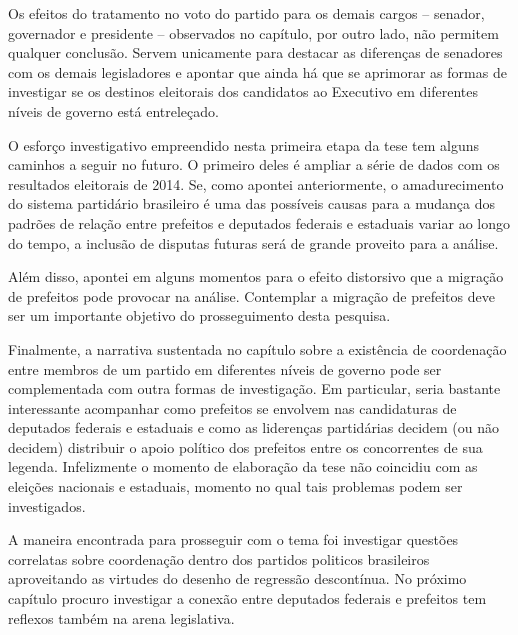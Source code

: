 Os efeitos do tratamento no voto do partido para os demais cargos -- senador, governador e presidente -- observados no capítulo, por outro lado, não permitem qualquer conclusão. Servem unicamente para destacar as diferenças de senadores com os demais legisladores e apontar que ainda há que se aprimorar as formas de investigar se os destinos eleitorais dos candidatos ao Executivo em diferentes níveis de governo está entreleçado.

O esforço investigativo empreendido nesta primeira etapa da tese tem alguns caminhos a seguir no futuro. O primeiro deles é ampliar a série de dados com os resultados eleitorais de 2014. Se, como apontei anteriormente, o amadurecimento do sistema partidário brasileiro é uma das possíveis causas para a mudança dos padrões de relação entre prefeitos e deputados federais e estaduais variar ao longo do tempo, a inclusão de disputas futuras será de grande proveito para a análise.

Além disso, apontei em alguns momentos para o efeito distorsivo que a migração de prefeitos pode provocar na análise. Contemplar a migração de prefeitos deve ser um importante objetivo do prosseguimento desta pesquisa.

Finalmente, a narrativa sustentada no capítulo sobre a existência de coordenação entre membros de um partido em diferentes níveis de governo pode ser complementada com outra formas de investigação. Em particular, seria bastante interessante acompanhar como prefeitos se envolvem nas candidaturas de deputados federais e estaduais e como as liderenças partidárias decidem (ou não decidem) distribuir o apoio político dos prefeitos entre os concorrentes de sua legenda. Infelizmente o momento de elaboração da tese não coincidiu com as eleições nacionais e estaduais, momento no qual tais problemas podem ser investigados.

A maneira encontrada para prosseguir com o tema foi investigar questões correlatas sobre coordenação dentro dos partidos politicos brasileiros aproveitando as virtudes do desenho de regressão descontínua. No próximo capítulo procuro investigar a conexão entre deputados federais e prefeitos tem reflexos também na arena legislativa.